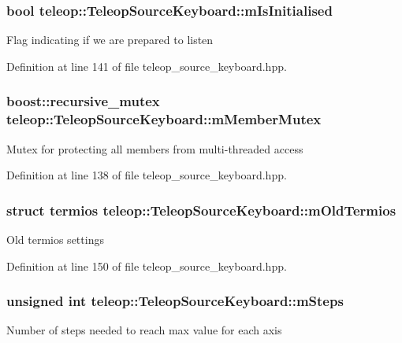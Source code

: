 \subsubsection[{mIsInitialised}]{\setlength{\rightskip}{0pt plus 5cm}bool {\bf teleop::TeleopSourceKeyboard::mIsInitialised}\hspace{0.3cm}{\ttfamily  [private]}}\label{classteleop_1_1TeleopSourceKeyboard_a83ec820735c831ac44344094548a7ccf}
Flag indicating if we are prepared to listen 

Definition at line 141 of file teleop\_\-source\_\-keyboard.hpp.

\subsubsection[{mMemberMutex}]{\setlength{\rightskip}{0pt plus 5cm}boost::recursive\_\-mutex {\bf teleop::TeleopSourceKeyboard::mMemberMutex}\hspace{0.3cm}{\ttfamily  [private]}}\label{classteleop_1_1TeleopSourceKeyboard_a16e92fa0ca9ba2c2338c7a32778d482e}
Mutex for protecting all members from multi-\/threaded access 

Definition at line 138 of file teleop\_\-source\_\-keyboard.hpp.

\subsubsection[{mOldTermios}]{\setlength{\rightskip}{0pt plus 5cm}struct termios {\bf teleop::TeleopSourceKeyboard::mOldTermios}\hspace{0.3cm}{\ttfamily  [private]}}\label{classteleop_1_1TeleopSourceKeyboard_a9eae880b1b2c83e02d9aa102adc5fe47}
Old termios settings 

Definition at line 150 of file teleop\_\-source\_\-keyboard.hpp.

\subsubsection[{mSteps}]{\setlength{\rightskip}{0pt plus 5cm}unsigned int {\bf teleop::TeleopSourceKeyboard::mSteps}\hspace{0.3cm}{\ttfamily  [private]}}\label{classteleop_1_1TeleopSourceKeyboard_a98fc7a02e157f4fa586f32731a93bb0a}
Number of steps needed to reach max value for each axis 

